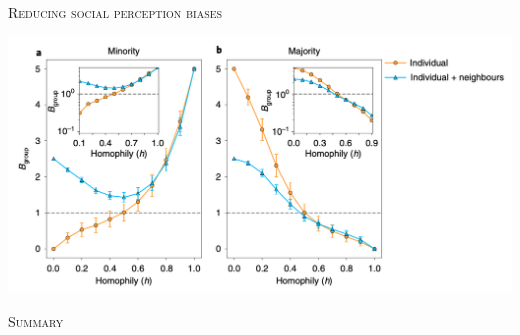 \documentclass{beamer}
\begin{document}
\begin{frame}
    \centering
    \Large{\textsc{Reducing social perception biases}} \\ \vspace{1cm}
    
\end{frame}

\begin{frame}
    \begin{center}
        \includegraphics[width=\textwidth]{static/reduce_biase_results.png}
    \end{center}
\end{frame}

\begin{frame}
    \centering
    \Large{\textsc{Summary}} \\ \vspace{1cm}
\end{frame}
\end{document}
